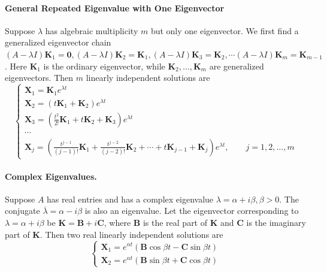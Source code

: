 \documentclass[oneside]{book}
\begin{document}
\paragraph{General Repeated Eigenvalue with One Eigenvector}
Suppose $\lambda$ has algebraic multiplicity $m$ but only one eigenvector. We first
find a generalized eigenvector chain $(A-\lambda I)\mathbf{K}_1=\mathbf{0}, (A-\lambda I)\mathbf{K}_2=\mathbf{K}_1,(A-\lambda I)\mathbf{K}_3=\mathbf{K}_2,\cdots  (A-\lambda I)\mathbf{K}_m=\mathbf{K}_{m-1}$. Here $\mathbf{K}_1$ is the ordinary eigenvector, while
$\mathbf{K}_2,\ldots,\mathbf{K}_m$ are generalized eigenvectors. Then $m$ linearly independent solutions are
\[
\begin{cases}
    \mathbf{X}_1
    =
    \mathbf{K}_1 e^{\lambda t} \\
    \mathbf{X}_2
    =
    \left(
        t\mathbf{K}_1+\mathbf{K}_2
    \right)e^{\lambda t} \\
     \mathbf{X}_3
    =
    \left(
        \frac{t^2}{2!}\mathbf{K}_1
        +
        t\mathbf{K}_2
        +
        \mathbf{K}_3
    \right)e^{\lambda t} \\
    \cdots \\
     \mathbf{X}_j
    =
    \left(
        \frac{t^{j-1}}{(j-1)!}\mathbf{K}_1
        +
        \frac{t^{j-2}}{(j-2)!}\mathbf{K}_2
        +
        \cdots
        +
        t\mathbf{K}_{j-1}
        +
        \mathbf{K}_j
    \right)e^{\lambda t},
    \qquad
    j=1,2,\ldots,m
\end{cases}
\]





\paragraph{Complex Eigenvalues.}
Suppose $A$ has real entries and has a complex eigenvalue $ \lambda=\alpha+i\beta, \beta>0$. The conjugate $\overline{\lambda}=\alpha-i\beta$ is also an eigenvalue. Let the eigenvector corresponding to $\lambda=\alpha+i\beta$ be $\mathbf{K}=\mathbf{B}+i\mathbf{C}$, where $\mathbf{B}$ is the real part of $\mathbf{K}$ and $\mathbf{C}$ is the imaginary part of $\mathbf{K}$. Then two real linearly independent solutions are
\[
\begin{cases}
     \mathbf{X}_1
    =
    e^{\alpha t}
    \left(
        \mathbf{B}\cos\beta t
        -
        \mathbf{C}\sin\beta t
    \right) \\
    \mathbf{X}_2
    =
    e^{\alpha t}
    \left(
        \mathbf{B}\sin\beta t
        +
        \mathbf{C}\cos\beta t
    \right)
\end{cases}
\]
\end{document}
